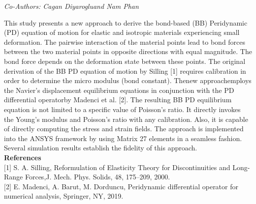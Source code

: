 \begin{center}
\textit{Co-Authors: Cagan Diyarogluand Nam Phan}
\end{center} 
This study presents a new approach to derive the bond-based (BB) Peridynamic (PD) equation of motion   for   elastic   and   isotropic   materials   experiencing   small   deformation.      The   pairwise interaction of the material points lead to bond forces between the two material points in opposite directions with equal magnitude.  The bond force depends on the deformation state between these points.  The original derivation of the BB PD equation of motion by Silling [1] requires calibration in order to determine the micro modulus (bond constant).  Thenew approachemploys the Navier’s displacement equilibrium equations in conjunction with the PD differential operatorby Madenci et al.  [2].    The  resulting  BB  PD  equilibrium  equation  is  not  limited  to  a  specific  value  of  Poisson’s ratio.  It directly invokes the Young’s modulus and Poisson’s ratio with any calibration.  Also, it is capable  of  directly  computing  the stress  and  strain  fields.    The  approach  is  implemented  into  the ANSYS framework by using Matrix 27 elements in a seamless fashion.  Several simulation results establish the fidelity of this approach. \\

\noindent\textbf{References}\\
$[$1$]$ S. A. Silling, Reformulation of Elasticity Theory for Discontinuities and Long-Range Forces,J. Mech. Phys. Solids, 48, 175–209, 2000.\\
$[$2$]$ E. Madenci, A. Barut, M. Dorduncu, Peridynamic differential operator for numerical analysis, Springer, NY, 2019.